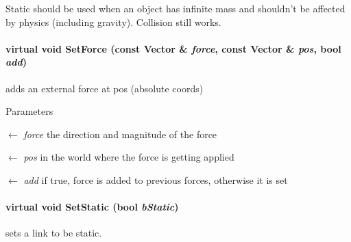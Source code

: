 Static should be used when an object has infinite mass and shouldn't be affected by physics (including gravity). Collision still works. \hypertarget{classOpenRAVE_1_1KinBody_1_1Link_a36916dd947512e36587e4ecfbf26887c}{
\paragraph[{SetForce}]{\setlength{\rightskip}{0pt plus 5cm}virtual void SetForce (const Vector \& {\em force}, \/  const Vector \& {\em pos}, \/  bool {\em add})}\hfill}
\label{classOpenRAVE_1_1KinBody_1_1Link_a36916dd947512e36587e4ecfbf26887c}
adds an external force at pos (absolute coords) 
\begin{DoxyParams}{Parameters}
\item[\mbox{$\leftarrow$} {\em force}]the direction and magnitude of the force \item[\mbox{$\leftarrow$} {\em pos}]in the world where the force is getting applied \item[\mbox{$\leftarrow$} {\em add}]if true, force is added to previous forces, otherwise it is set \end{DoxyParams}
\hypertarget{classOpenRAVE_1_1KinBody_1_1Link_ad2869657aaca15eb379f92e506206a15}{
\paragraph[{SetStatic}]{\setlength{\rightskip}{0pt plus 5cm}virtual void SetStatic (bool {\em bStatic})}\hfill}
\label{classOpenRAVE_1_1KinBody_1_1Link_ad2869657aaca15eb379f92e506206a15}


sets a link to be static. 

